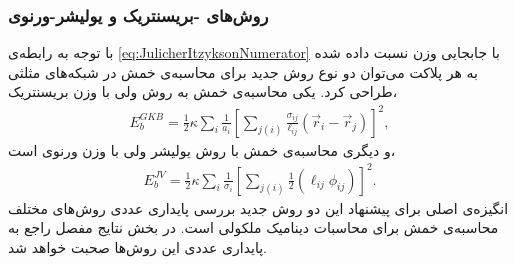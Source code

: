 \subsubsection{
روش‌های -بریسنتریک و یولیشر-ورنوی
}
با توجه به رابطه‌ی 
\ref{eq:JulicherItzyksonNumerator}
با جابجایی وزن نسبت داده شده به هر پلاکت می‌توان دو نوع روش جدید برای محاسبه‌ی خمش در شبکه‌های مثلثی طراحی کرد. یکی محاسبه‌ی خمش به روش  ولی با وزن بریسنتریک،
\begin{eqnarray}
E_{b}^{GKB}=\frac{1}{2}\kappa\sum_{i}\frac{1}{a_i}\left[\sum_{j(i)}\frac{\sigma_{ij}}{\ell_{ij}}(\vec r_i-\vec r_j)\right]^2,
\label{eq:ItzyksonBarycentricPotential}
\end{eqnarray}
و دیگری محاسبه‌ی خمش با روش یولیشر ولی با وزن ورنوی است،
\begin{eqnarray}
E_{b}^{JV}=\frac{1}{2}\kappa\sum_{i}\frac{1}{\sigma_i}\left[\sum_{j(i)}\frac{1}{2}(\ell_{ij}\phi_{ij})\right]^2.
\label{eq:JulicherVoronoiPotential}
\end{eqnarray}
انگیزه‌ی اصلی برای پیشنهاد این دو روش جدید بررسی پایداری عددی روش‌های مختلف محاسبه‌ی خمش برای محاسبات دینامیک ملکولی است.  در بخش نتایج مفصل راجع به پایداری عددی این روش‌ها صحبت خواهد شد.








 